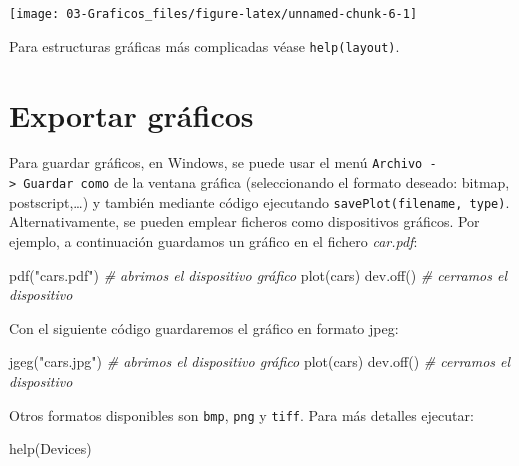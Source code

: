 \documentclass[
]{book}
\newenvironment{Shaded}{\begin{snugshade}}{\end{snugshade}}
\newcommand{\CommentTok}[1]{\textcolor[rgb]{0.56,0.35,0.01}{\textit{#1}}}
\newcommand{\FunctionTok}[1]{\textcolor[rgb]{0.00,0.00,0.00}{#1}}
\newcommand{\NormalTok}[1]{#1}
\newcommand{\StringTok}[1]{\textcolor[rgb]{0.31,0.60,0.02}{#1}}
\theoremstyle{break}
\theoremstyle{nonumberplain}
\begin{document}
\begin{center}\texttt{[image: 03-Graficos\_files/figure-latex/unnamed-chunk-6-1]} \end{center}

Para estructuras gráficas más complicadas véase \texttt{help(layout)}.

\hypertarget{exportar-gruxe1ficos}{%
\section{Exportar gráficos}\label{exportar-gruxe1ficos}}

Para guardar gráficos, en
Windows, se puede usar el menú \texttt{Archivo\ -\textgreater{}\ Guardar\ como} de la ventana gráfica (seleccionando el formato deseado: bitmap, postscript,\ldots) y también
mediante código ejecutando \texttt{savePlot(filename,\ type)}.
Alternativamente, se pueden emplear ficheros como dispositivos gráficos. Por ejemplo, a continuación guardamos un gráfico en el fichero \emph{car.pdf}:

\begin{Shaded}
\begin{Highlighting}[]
\FunctionTok{pdf}\NormalTok{(}\StringTok{"cars.pdf"}\NormalTok{)   }\CommentTok{\# abrimos el dispositivo gráfico}
\FunctionTok{plot}\NormalTok{(cars)}
\FunctionTok{dev.off}\NormalTok{()         }\CommentTok{\# cerramos el dispositivo}
\end{Highlighting}
\end{Shaded}

Con el siguiente código guardaremos el gráfico en formato jpeg:

\begin{Shaded}
\begin{Highlighting}[]
\FunctionTok{jgeg}\NormalTok{(}\StringTok{"cars.jpg"}\NormalTok{)  }\CommentTok{\# abrimos el dispositivo gráfico}
\FunctionTok{plot}\NormalTok{(cars)}
\FunctionTok{dev.off}\NormalTok{()         }\CommentTok{\# cerramos el dispositivo}
\end{Highlighting}
\end{Shaded}

Otros formatos disponibles son \texttt{bmp}, \texttt{png} y \texttt{tiff}. Para más detalles ejecutar:

\begin{Shaded}
\begin{Highlighting}[]
\FunctionTok{help}\NormalTok{(Devices)}
\end{Highlighting}
\end{Shaded}
\end{document}
